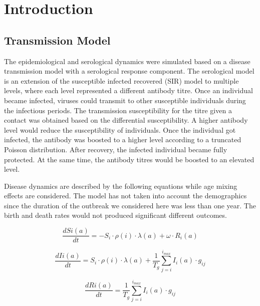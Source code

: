 \documentclass{article}
\begin{document}
\section{Introduction}
\subsection{Transmission Model}
The epidemiological and serological dynamics were simulated based on a disease transmission model with a serological response component. The serological model is an extension of the susceptible infected recovered (SIR) model to multiple levels, where each level represented a different antibody titre. 
Once an individual became infected, viruses could transmit to other susceptible individuals during the infectious periods. The transmission susceptibility for the titre given a contact was obtained based on the differential susceptibility. A higher antibody level would reduce the susceptibility of individuals. Once the individual got infected, the antibody was boosted to a higher level according to a truncated Poisson distribution. After recovery, the infected individual became  fully protected. At the same time, the antibody titres would be boosted to an elevated level.

Disease dynamics are described by the following equations while age mixing effects are considered. The model has not taken into account the demographics since the duration of the outbreak we considered here was less than one year. The birth and death rates would not produced significant different outcomes.

\begin{equation}
 \label{simple_equation}
 \frac{dS{i}(a)}{dt}=-S_{i}\cdot\rho(i)\cdot\lambda(a)+\omega\cdot R_{i}(a)
\end{equation}

\begin{equation}
 \frac{dI{i}(a)}{dt}=S_{i}\cdot\rho(i)\cdot\lambda(a)+\frac{1}{T_{g}}\sum_{j=i}^{i_{max}} I_{i}(a)\cdot g_{ij}
\end{equation}

\begin{equation}
 \frac{dR{i}(a)}{dt}=\frac{1}{T_{g}} \sum_{j=i}^{i_{max}} I_{i}(a)\cdot g_{ij}
\end{equation}
\end{document}
